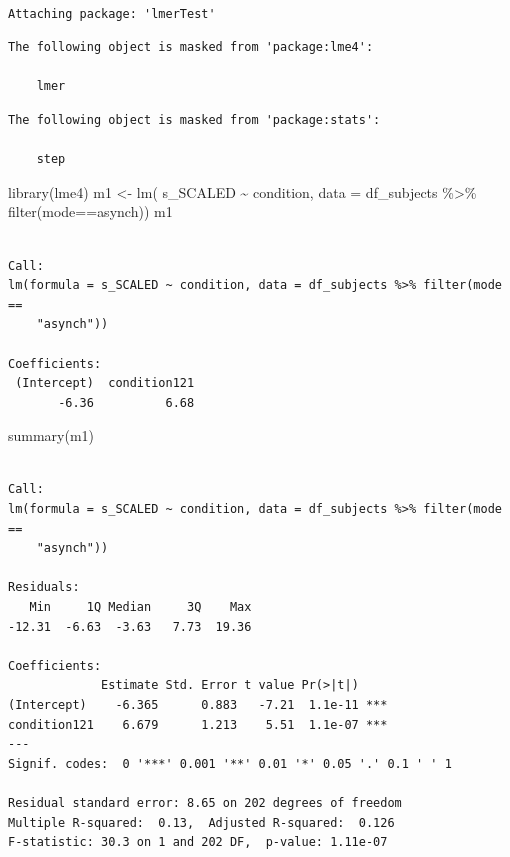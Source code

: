 \documentclass[
  letterpaper,
  DIV=11,
  numbers=noendperiod]{scrreprt}
\newenvironment{Shaded}{\begin{snugshade}}{\end{snugshade}}
\newcommand{\AttributeTok}[1]{\textcolor[rgb]{0.40,0.45,0.13}{#1}}
\newcommand{\FunctionTok}[1]{\textcolor[rgb]{0.28,0.35,0.67}{#1}}
\newcommand{\NormalTok}[1]{\textcolor[rgb]{0.00,0.23,0.31}{#1}}
\newcommand{\OtherTok}[1]{\textcolor[rgb]{0.00,0.23,0.31}{#1}}
\newcommand{\SpecialCharTok}[1]{\textcolor[rgb]{0.37,0.37,0.37}{#1}}
\newcommand{\StringTok}[1]{\textcolor[rgb]{0.13,0.47,0.30}{#1}}
\begin{document}
\begin{verbatim}

Attaching package: 'lmerTest'
\end{verbatim}

\begin{verbatim}
The following object is masked from 'package:lme4':

    lmer
\end{verbatim}

\begin{verbatim}
The following object is masked from 'package:stats':

    step
\end{verbatim}

\begin{Shaded}
\begin{Highlighting}[]
\FunctionTok{library}\NormalTok{(lme4)}
\NormalTok{m1 }\OtherTok{\textless{}{-}} \FunctionTok{lm}\NormalTok{( s\_SCALED }\SpecialCharTok{\textasciitilde{}}\NormalTok{ condition, }\AttributeTok{data =}\NormalTok{ df\_subjects }\SpecialCharTok{\%\textgreater{}\%} \FunctionTok{filter}\NormalTok{(mode}\SpecialCharTok{==}\StringTok{\textquotesingle{}asynch\textquotesingle{}}\NormalTok{))}
\NormalTok{m1}
\end{Highlighting}
\end{Shaded}

\begin{verbatim}

Call:
lm(formula = s_SCALED ~ condition, data = df_subjects %>% filter(mode == 
    "asynch"))

Coefficients:
 (Intercept)  condition121  
       -6.36          6.68  
\end{verbatim}

\begin{Shaded}
\begin{Highlighting}[]
\FunctionTok{summary}\NormalTok{(m1)}
\end{Highlighting}
\end{Shaded}

\begin{verbatim}

Call:
lm(formula = s_SCALED ~ condition, data = df_subjects %>% filter(mode == 
    "asynch"))

Residuals:
   Min     1Q Median     3Q    Max 
-12.31  -6.63  -3.63   7.73  19.36 

Coefficients:
             Estimate Std. Error t value Pr(>|t|)    
(Intercept)    -6.365      0.883   -7.21  1.1e-11 ***
condition121    6.679      1.213    5.51  1.1e-07 ***
---
Signif. codes:  0 '***' 0.001 '**' 0.01 '*' 0.05 '.' 0.1 ' ' 1

Residual standard error: 8.65 on 202 degrees of freedom
Multiple R-squared:  0.13,  Adjusted R-squared:  0.126 
F-statistic: 30.3 on 1 and 202 DF,  p-value: 1.11e-07
\end{verbatim}
\end{document}

